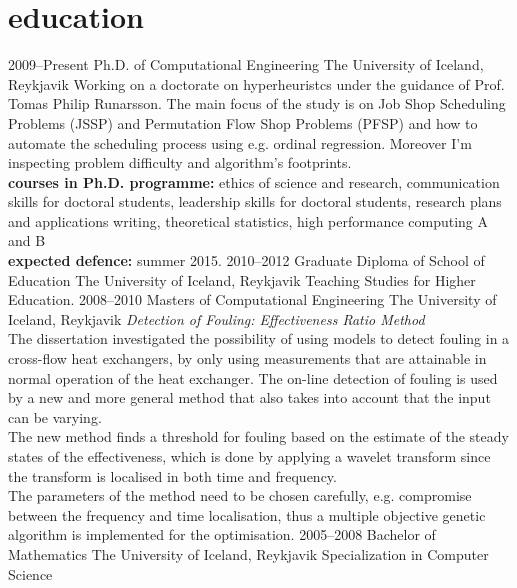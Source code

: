 \documentclass[]{cv} %
\begin{document}
\section{education}
\begin{entrylist}
\entry
{2009--Present}
{Ph.D. {\normalfont of Computational Engineering}}
{The University of Iceland, Reykjavik}
{Working on a doctorate on hyperheuristcs under the guidance of Prof. Tomas Philip Runarsson. The main focus of the study is on Job Shop Scheduling Problems (JSSP) and Permutation Flow Shop Problems (PFSP) and how to automate the scheduling process using e.g. ordinal regression. Moreover I'm inspecting problem difficulty and algorithm's footprints. \\
\textbf{courses in Ph.D. programme:} 
ethics of science and research, communication skills for doctoral students, leadership skills for doctoral students, research plans and applications writing, theoretical statistics, high performance computing A and B  \\
\textbf{expected defence:} summer 2015.}
\entry
{2010--2012}
{Graduate Diploma {\normalfont of School of Education}}
{The University of Iceland, Reykjavik}
{Teaching Studies for Higher Education.}
\entry
{2008--2010}
{Masters {\normalfont of Computational Engineering}}
{The University of Iceland, Reykjavik}
{\emph{Detection of Fouling: Effectiveness Ratio Method} \\ 
The dissertation investigated the possibility of using models to detect fouling in a cross-flow heat exchangers, by only using measurements that are attainable in normal operation of the heat exchanger.  The on-line detection of fouling is used by a new and more general method that also takes into account that the input can be varying. \\
The new method finds a threshold for fouling based on the estimate of the steady states of the effectiveness, which is done by applying a wavelet transform since the transform is localised in both time and frequency. \\
The parameters of the method need to be chosen carefully, e.g. compromise between the frequency and time localisation, thus a multiple objective genetic algorithm is implemented for the optimisation. }
\entry
{2005--2008}
{Bachelor {\normalfont of Mathematics}}
{The University of Iceland, Reykjavik}
{Specialization in Computer Science}
\end{entrylist}
\end{document}
